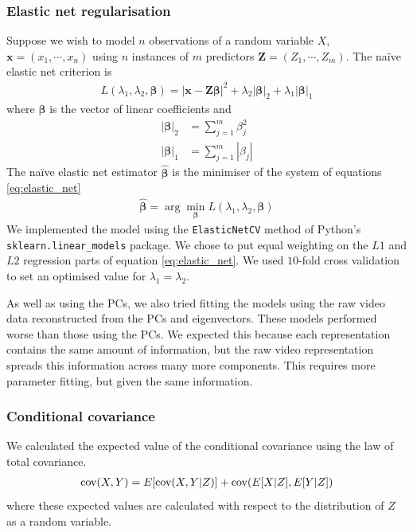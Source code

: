         \subsubsection{Elastic net regularisation}
        Suppose we wish to model $n$ observations of a random variable $X$, $\mathbf{x} = (x_1, \cdots, x_n)$ using $n$ instances of $m$ predictors $\mathbf{Z} = (Z_1, \cdots, Z_m)$. The na\"{i}ve elastic net criterion is
        \begin{align}\label{eq:elastic_net}
            L(\lambda_1, \lambda_2, \boldsymbol{\beta}) = | \mathbf{x} - \mathbf{Z} \boldsymbol{\beta} |^2 + \lambda_2 |\boldsymbol{\beta}|_2 + \lambda_1 |\boldsymbol{\beta}|_1
        \end{align}
        where $\boldsymbol{\beta}$ is the vector of linear coefficients and 
        \begin{align}
          |\boldsymbol{\beta}|_2 &= \sum_{j=1}^m \beta_j^2 \\
          |\boldsymbol{\beta}|_1 &= \sum_{j=1}^m |\beta_j|
        \end{align}
        The na\"{i}ve elastic net estimator $\hat{\boldsymbol{\beta}}$ is the minimiser of the system of equations \ref{eq:elastic_net}  \parencite{zou}
        \begin{align}
          \hat{\boldsymbol{\beta}} = \arg \min_{\boldsymbol{\beta}} L(\lambda_1, \lambda_2, \boldsymbol{\beta})
        \end{align}
        We implemented the model using the \texttt{ElasticNetCV} method of Python's \\ \texttt{sklearn.linear\_models} package. We chose to put equal weighting on the $L1$ and $L2$ regression parts of equation \ref{eq:elastic_net}. We used $10$-fold cross validation to set an  optimised value for $\lambda_1 = \lambda_2$.

        As well as using the PCs, we also tried fitting the models using the raw video data reconstructed from the PCs and eigenvectors. These models performed worse than those using the PCs. We expected this because each representation contains the same amount of information, but the raw video representation spreads this information across many more components. This requires more parameter fitting, but given the same information.

        \subsubsection{Conditional covariance}\label{sec:conditional_covariance}
        We calculated the expected value of the conditional covariance using the law of total covariance.
        \begin{align}\label{eq:law_of_total_covariance}
            \text{cov} (X,Y) = E[ \text{cov}(X,Y|Z)] + \text{cov}(E[X|Z], E[Y|Z])
        \end{align}
        where these expected values are calculated with respect to the distribution of $Z$ as a random variable.

